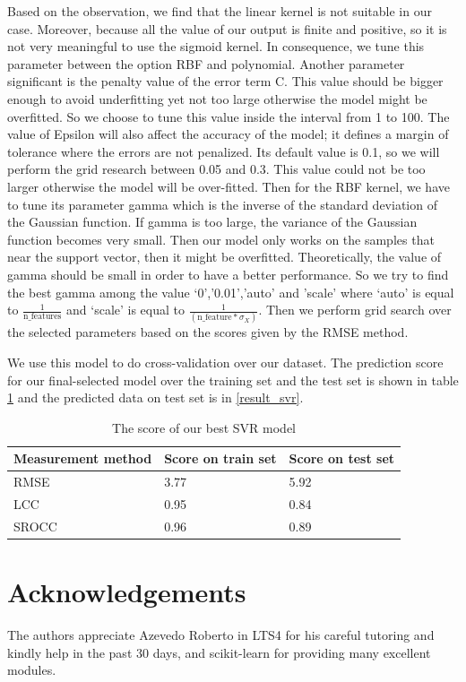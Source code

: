 \documentclass[10pt,conference,compsocconf]{IEEEtran}
\begin{document}
\par Based on the observation, we find that the linear kernel is not suitable in our case. Moreover, because all the value of our output is finite and positive, so it is not very meaningful to use the sigmoid kernel. In consequence, we tune this parameter between the option RBF and polynomial. Another parameter significant is the penalty value of the error term C. This value should be bigger enough to avoid underfitting yet not too large otherwise the model might be overfitted. So we choose to tune this value inside the interval from 1 to 100. The value of Epsilon will also affect the accuracy of the model; it defines a margin of tolerance where the errors are not penalized. Its default value is 0.1, so we will perform the grid research between 0.05 and 0.3. This value could not be too larger otherwise the model will be over-fitted. Then for the RBF kernel, we have to tune its parameter gamma which is the inverse of the standard deviation of the Gaussian function. If gamma is too large, the variance of the Gaussian function becomes very small. Then our model only works on the samples that near the support vector, then it might be overfitted. Theoretically, the value of gamma should be small in order to have a better performance. So we try to find the best gamma among the value ‘0’,’0.01’,’auto’ and ’scale’ where ‘auto’ is equal to $\frac{1}{\text{n\_features}}$ and ‘scale’ is equal to $\frac{1}{(\text{n\_feature} * \sigma_X)}$. Then we perform grid search over the selected parameters based on the scores given by the RMSE method.
\par We use this model to do cross-validation over our dataset. The prediction score for our final-selected model over the training set and the test set is shown in table \ref{best_svr} and the predicted data on test set is in \ref{result_svr}.
\begin{table}[h]
  \centering
  \begin{tabular}[c]{|l||l|l|}
    \hline
    Measurement method & Score on train set & Score on test set\\
    \hline
    RMSE & 3.77 & 5.92 \\
    LCC & 0.95 & 0.84 \\
    SROCC & 0.96 & 0.89  \\
    \hline
  \end{tabular}
  \caption{The score of our best SVR model}
  \label{best_svr}
\end{table}

\section*{Acknowledgements}
The authors appreciate Azevedo Roberto in LTS4 for his careful tutoring and kindly help in the past 30 days, and scikit-learn\cite{scikit-learn} for providing many excellent modules.



\end{document}
